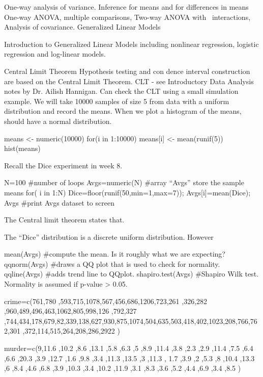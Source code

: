 \documentclass[a4paper,12pt]{article}
\begin{document}
One-way analysis of variance.
Inference for means and for differences in means
One-way ANOVA, multiple comparisons,
Two-way ANOVA with  interactions,
Analysis of covariance.
Generalized Linear Models

Introduction to Generalized Linear Models including nonlinear regression, logistic regression and log-linear models.



 
Central Limit Theorem
Hypothesis testing and con dence interval construction are based on the Central Limit Theorem.
CLT - see Introductory Data Analysis notes by Dr. Ailish Hannigan.
Can check the CLT using a small simulation example.
We will take 10000 samples of size 5 from data with a uniform distribution and record the means.
When we plot a histogram of the means, should have a normal distribution.
 
means <- numeric(10000)
for(i in 1:10000){
means[i] <- mean(runif(5))
}
hist(means)
 

Recall the Dice experiment in week 8.
 
N=100           	          	          	             #number of loops
Avgs=numeric(N)           	             #array “Avgs” store the sample means
for( i in 1:N)
              {              Dice=floor(runif(50,min=1,max=7));              Avgs[i]=mean(Dice);
              }
Avgs           	          	          	             #print Avgs dataset to screen
 
The Central limit theorem states that.

The “Dice” distribution is a discrete uniform distribution. However

mean(Avgs)           	          	             #compute the mean. Is it roughly what we are expecting?
qqnorm(Avgs)           	          	             #draws a QQ plot that is used to check for normality.
qqline(Avgs)           	          	             #adds trend line to QQplot.
shapiro.test(Avgs)           	             #Shapiro Wilk test. Normality is assumed if p-value > 0.05.
	                                     


crime=c(761,780 ,593,715,1078,567,456,686,1206,723,261 ,326,282 ,960,489,496,463,1062,805,998,126 ,792,327 ,744,434,178,679,82,339,138,627,930,875,1074,504,635,503,418,402,1023,208,766,762,301 ,372,114,515,264,208,286,2922 )

murder=c(9,11.6 ,10.2 ,8.6 ,13.1 ,5.8 ,6.3 ,5 ,8.9 ,11.4 ,3.8 ,2.3 ,2.9 ,11.4 ,7.5 ,6.4 ,6.6 ,20.3 ,3.9 ,12.7 ,1.6 ,9.8 ,3.4 ,11.3 ,13.5 ,3 ,11.3 ,
1.7 ,3.9 ,2 ,5.3 ,8 ,10.4 ,13.3 ,6 ,8.4 ,4.6 ,6.8 ,3.9 ,10.3 ,3.4 ,10.2 ,11.9 ,3.1 ,8.3 ,3.6 ,5.2 ,4.4 ,6.9 ,3.4 ,8.5 )
\end{document}
